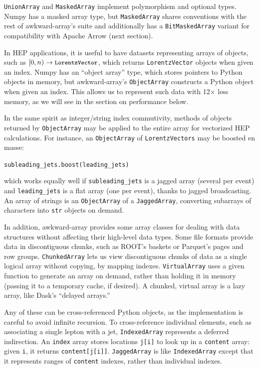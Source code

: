 \documentclass{webofc}
\begin{document}
{\tt\small UnionArray} and {\tt\small MaskedArray} implement polymorphism and optional types. Numpy has a masked array type, but {\tt\small MaskedArray} shares conventions with the rest of awkward-array's suite and additionally has a {\tt\small BitMaskedArray} variant for compatibility with Apache Arrow (next section).

In HEP applications, it is useful to have datasets representing arrays of objects, such as $[0, n) \to \mbox{\tt\small LorentzVector}$, which returns \mbox{\tt\small LorentzVector} objects when given an index. Numpy has an ``object array'' type, which stores pointers to Python objects in memory, but awkward-array's {\tt\small ObjectArray} constructs a Python object when given an index. This allows us to represent such data with 12$\times$ less memory, as we will see in the section on performance below.

In the same spirit as integer/string index commutivity, methods of objects returned by {\tt\small ObjectArray} may be applied to the entire array for vectorized HEP calculations. For instance, an {\tt\small ObjectArray} of \mbox{\tt\small LorentzVectors} may be boosted en masse:

\begin{center}
\tt\small subleading\_jets.boost(leading\_jets)
\end{center}

\noindent which works equally well if {\tt\small subleading\_jets} is a jagged array (several per event) and {\tt\small leading\_jets} is a flat array (one per event), thanks to jagged broadcasting. An array of strings is an {\tt\small ObjectArray} of a {\tt\small JaggedArray}, converting subarrays of characters into {\tt\small str} objects on demand.

In addition, awkward-array provides some array classes for dealing with data structures without affecting their high-level data types. Some file formats provide data in discontiguous chunks, such as ROOT's baskets or Parquet's pages and row groups. {\tt\small ChunkedArray} lets us view discontiguous chunks of data as a single logical array without copying, by mapping indexes. {\tt\small VirtualArray} uses a given function to generate an array on demand, rather than holding it in memory (passing it to a temporary cache, if desired). A chunked, virtual array is a lazy array, like Dask's ``delayed arrays.''

Any of these can be cross-referenced Python objects, as the implementation is careful to avoid infinite recursion. To cross-reference individual elements, such as associating a single lepton with a jet, {\tt\small IndexedArray} represents a deferred indirection. An {\tt\small index} array stores locations {\tt\small j[i]} to look up in a {\tt\small content} array: given {\tt\small i}, it returns {\tt\small content[j[i]]}. {\tt\small JaggedArray} is like {\tt\small IndexedArray} except that it represents ranges of {\tt\small content} indexes, rather than individual indexes.
\end{document}
